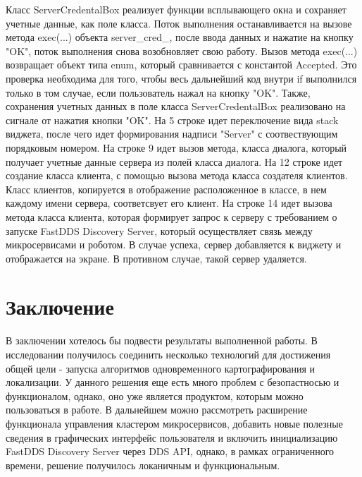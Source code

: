 \documentclass[a4paper, 14pt]{extreport}
\begin{document}
\par Класс ServerCredentalBox реализует функции всплывающего окна и сохраняет учетные данные, как поле класса. Поток выполнения останавливается 
на вызове метода exec(...) объекта server\_cred\_, после ввода данных и нажатие на кнопку "OK", поток выполнения снова возобновляет свою работу.
Вызов метода exec(...) возвращает объект типа enum, который сравнивается с константой Accepted. Это проверка необходима для того, чтобы 
весь дальнейший код внутри if выполнился только в том случае, если пользователь нажал на кнопку "OK". Также, сохранения учетных данных 
в поле класса ServerCredentalBox реализовано на сигнале от нажатия кнопки "OK". На 5 строке идет переключение вида stack виджета, после 
чего идет формирования надписи "Server" с соотвествующим порядковым номером. На строке 9 идет вызов метода, класса диалога, который 
получает учетные данные сервера из полей класса диалога. На 12 строке идет создание класса клиента, с помощью вызова метода класса 
создателя клиентов. Класс клиентов, копируется в отображение расположенное в классе, в нем каждому имени сервера, соответсвует его 
клиент. На строке 14 идет вызова метода класса клиента, которая формирует запрос к серверу с требованием о запуске FastDDS Discovery 
Server, который осуществляет связь между микросервисами и роботом. В случае успеха, сервер добавляется к виджету и отображается на 
экране. В противном случае, такой сервер удаляется.
\chapter{Заключение}
\par В заключении хотелось бы подвести результаты выполненной работы. В исследовании получилось соединить несколько 
технологий для достижения общей цели - запуска алгоритмов одновременного картографирования и локализации. У данного 
решения еще есть много проблем с безопастносью и функционалом, однако, оно уже является продуктом, которым можно 
пользоваться в работе. В дальнейшем можно рассмотреть расширение функционала управления кластером микросервисов,
добавить новые полезные сведения в графических интерфейс пользователя и включить инициализацию FastDDS Discovery Server
через DDS API, однако, в рамках ограниченного времени, решение получилось локаничным и функциональным.
\end{document}

